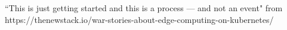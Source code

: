 “This is just getting started and this is a process — and not an event"
from https://thenewstack.io/war-stories-about-edge-computing-on-kubernetes/